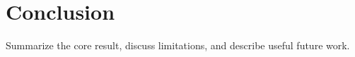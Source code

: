 \section{Conclusion}
\label{sec:conclusion}

Summarize the core result, discuss limitations, and describe useful future work.
